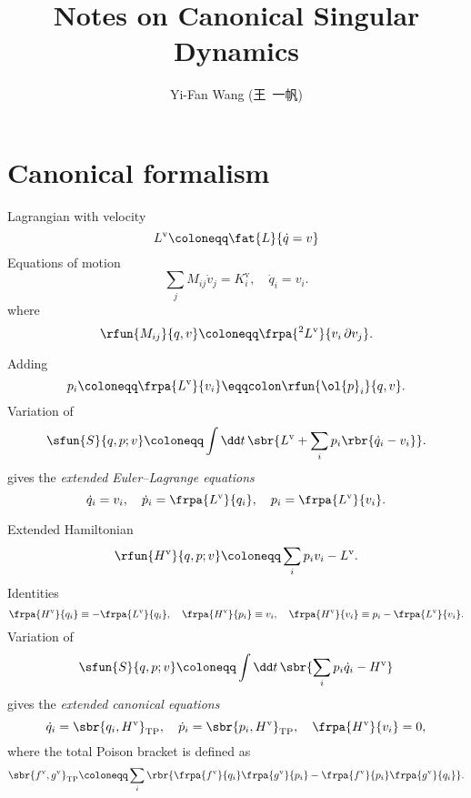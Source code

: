 \documentclass[a4paper,10pt]{article}
\title{Notes on Canonical Singular Dynamics}
\author{Yi-Fan Wang (王\ 一帆)}
\begin{document}
\maketitle

\section{Canonical formalism}

Lagrangian with velocity
\begin{equation}
L^\text{v} \coloneqq \fat{L}{\dot{q} = v}
\end{equation}
Equations of motion
\begin{equation}
\sum_j M_{ij}\dot{v}_j = K^\text{v}_i,\quad
\dot{q}_i = v_i.
\end{equation}
where
\begin{equation}
\rfun{M_{ij}}{q,v} \coloneqq \frpa{^2 L^\text{v}}{v_i\,\partial v_j}.
\end{equation}

Adding
\begin{equation}
p_i \coloneqq \frpa{L^\text{v}}{v_i} \eqqcolon \rfun{\ol{p}_i}{q,v}.
\end{equation}
Variation of
\begin{equation}
\sfun{S}{q, p; v} \coloneqq \int\dd t\,\sbr{L^\text{v} + \sum_i 
p_i\rbr{\dot{q}_i - v_i}}.
\end{equation}
gives the \emph{extended Euler--Lagrange equations}
\begin{equation}
\dot{q}_i = v_i,\quad
\dot{p}_i = \frpa{L^\text{v}}{q_i},\quad
p_i = \frpa{L^\text{v}}{v_i}.
\end{equation}

Extended Hamiltonian
\begin{equation}
\rfun{H^\text{v}}{q, p; v} \coloneqq \sum_i p_i v_i - L^\text{v}.
\end{equation}
Identities
\begin{equation}
\frpa{H^\text{v}}{q_i} \equiv - \frpa{L^\text{v}}{q_i},\quad
\frpa{H^\text{v}}{p_i} \equiv v_i,\quad
\frpa{H^\text{v}}{v_i} \equiv p_i - \frpa{L^\text{v}}{v_i}.
\end{equation}
Variation of
\begin{equation}
\sfun{S}{q, p; v} \coloneqq \int\dd t\,\sbr{\sum_i 
p_i \dot{q}_i - H^\text{v}}
\end{equation}
gives the \emph{extended canonical equations}
\begin{equation}
\dot{q}_i = \sbr{q_i, H^\text{v}}_\text{TP},\quad
\dot{p}_i = \sbr{p_i, H^\text{v}}_\text{TP},\quad
\frpa{H^\text{v}}{v_i} = 0,
\end{equation}
where the total Poison bracket is defined as
\begin{equation}
\sbr{f^\text{v}, g^\text{v}}_\text{TP} \coloneqq 
\sum_i\rbr{\frpa{f^\text{v}}{q_i}\frpa{g^\text{v}}{p_i} -
\frpa{f^\text{v}}{p_i}\frpa{g^\text{v}}{q_i}}.
\end{equation}
\end{document}
